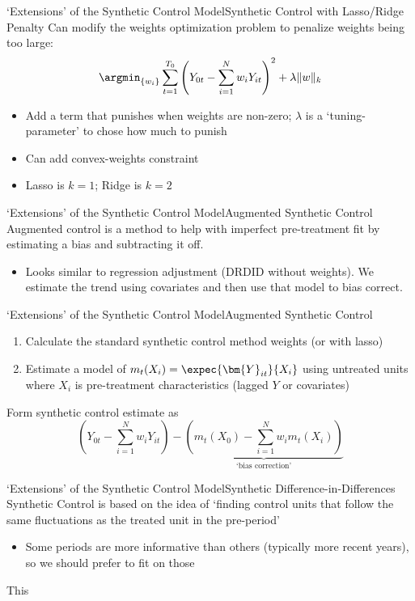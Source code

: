 \documentclass[t]{beamer}
\begin{document}
\begin{frame}{`Extensions' of the Synthetic Control Model}{Synthetic Control with Lasso/Ridge Penalty}
  Can modify the weights optimization problem to penalize weights being too large:
  $$
    \argmin_{ \{ w_i \} } \sum_{t=1}^{T_0} \left( Y_{0t} - \sum_{i=1}^N w_i Y_{it} \right)^2 + \lambda \| w \|_k
  $$
  \begin{itemize}
    \item Add a term that punishes when weights are non-zero; $\lambda$ is a `tuning-parameter' to chose how much to punish
    \item Can add convex-weights constraint
    \item Lasso is $k = 1$; Ridge is $k = 2$
  \end{itemize}
\end{frame}


\begin{frame}{`Extensions' of the Synthetic Control Model}{Augmented Synthetic Control}
  Augmented control is a method to help with imperfect pre-treatment fit by estimating a bias and subtracting it off. 
  \begin{itemize}
    \item Looks similar to regression adjustment (DRDID without weights). We estimate the trend using covariates and then use that model to bias correct. 
  \end{itemize}
\end{frame}

\begin{frame}{`Extensions' of the Synthetic Control Model}{Augmented Synthetic Control}
  \begin{enumerate}
    \item Calculate the standard synthetic control method weights (or with lasso)
    \item Estimate a model of $m_{t}(X_i) = \expec{\bm{Y}_{it}}{X_i}$ using untreated units where $X_i$ is pre-treatment characteristics (lagged $Y$ or covariates)
  \end{enumerate}

  \bigskip
  Form synthetic control estimate as 
  $$
    \left( Y_{0t} - \sum_{i = 1}^N w_i Y_{it} \right) -
      \underbrace{\left( m_{t}(X_0) - \sum_{i = 1}^N w_i m_t(X_i) \right)}_{\text{`bias correction'}}
  $$
\end{frame}



\begin{frame}{`Extensions' of the Synthetic Control Model}{Synthetic Difference-in-Differences}
  Synthetic Control is based on the idea of `finding control units that follow the same fluctuations as the treated unit in the pre-period'
  \begin{itemize}
    \item Some periods are more informative than others (typically more recent years), so we should prefer to fit on those
  \end{itemize}

  This 
\end{frame}
\end{document}
